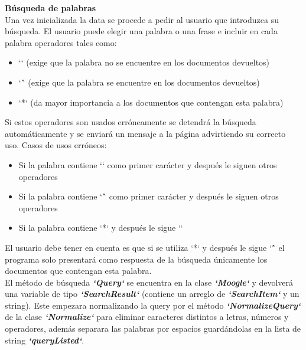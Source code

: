 \documentclass{article}
\begin{document}
\begin{flushleft}
\Large {\textbf{Búsqueda de palabras}}\linebreak \\
\large {Una vez inicializada la data se procede a pedir al usuario que introduzca su búsqueda. 
El usuario puede elegir una palabra o una frase e incluir en cada palabra operadores 
tales como:}

\begin{itemize}
\item\large{ `\textexclamdown` (exige que la palabra no se encuentre en los documentos devueltos)}
\item\large{`\^` (exige que la palabra se encuentre en los documentos devueltos)
}
\item\large{`*` (da mayor importancia a los documentos que contengan esta palabra)
}
\end{itemize}

\large {Si estos operadores son usados erróneamente se detendrá la búsqueda
automáticamente y se enviará un mensaje a la página advirtiendo su correcto uso. 
Casos de usos erróneos:}

\begin{itemize}
\item\large{ Si la palabra contiene `\textexclamdown` como primer carácter y después le siguen otros operadores}
\item\large{Si la palabra contiene `\^` como primer carácter y después le siguen otros operadores}
\item\large{Si la palabra contiene `*` y después le sigue `\textexclamdown`}
\end{itemize}

\large {El usuario debe tener en cuenta es que si se utiliza `*` y después le sigue `\^` el programa 
solo presentará como respuesta de la búsqueda únicamente los documentos que 
contengan esta palabra.\linebreak \\

El método de búsqueda \textbf{\textit{`Query`}} se encuentra en la clase \textbf{\textit{`Moogle`}} y devolverá una 
variable de tipo \textbf{\textit{`SearchResult`}} (contiene un arreglo de \textbf{\textit{`SearchItem`}} y un string). Este 
empezara normalizando la query por el método \textbf{\textit{`NormalizeQuery`}} de la clase \textbf{\textit{`Normalize`}} 
para eliminar caracteres distintos a letras, números y operadores, además separara las 
palabras por espacios guardándolas en la lista de string \textbf{\textit{`queryListed`}}.\linebreak \\

}
\end{flushleft}
\end{document}
